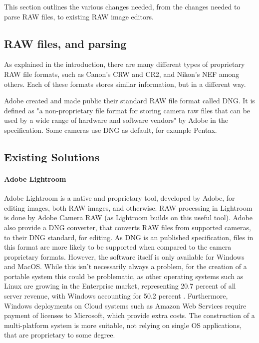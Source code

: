 \documentclass[10pt,a4paper]{article}
\begin{document}
This section outlines the various changes needed, from the changes needed to parse RAW files, to existing RAW image editors.

\subsection{RAW files, and parsing}
% 


As explained in the introduction, there are many different types of proprietary RAW file formats, such as Canon's CRW and CR2, and Nikon's NEF among others.
Each of these formats stores similar information, but in a different way.

Adobe created and made public their standard RAW file format called DNG. It is defined as "a non-proprietary file format for storing camera raw files that
can be used by a wide range of hardware and software vendors" by Adobe in the specification. \cite{DNGSpec} Some cameras use DNG as default, for example
Pentax.


\subsection{Existing Solutions}

    \paragraph{Adobe Lightroom}
    Adobe Lightroom is a native and proprietary tool, developed by Adobe, for editing images, both RAW images, and otherwise.
    RAW processing in Lightroom is done by Adobe Camera RAW (as Lightroom builds on this useful tool). \cite{AdobeCameraRAW}
    Adobe also provide a DNG converter, that converts RAW files from supported cameras, to their DNG standard,
    for editing. As DNG is an published specification, files in this format are more likely to be supported
    when compared to the camera proprietary formats. However, the software itself is only available for Windows
    and MacOS.\cite{AdobeDNGConverter} While this isn't necessarily always a problem, for the creation of a portable system this could be problematic,
    as other operating systems such as Linux are growing in the Enterprise market, representing 20.7 percent of all server revenue, with Windows
    accounting for 50.2 percent \cite{LinuxServerGrowth}. Furthermore, Windows deployments on Cloud systems such as Amazon Web Services require
    payment of licenses to Microsoft, which provide extra costs. The construction of a multi-platform system is more suitable, not relying on
    single OS applications, that are proprietary to some degree.
\end{document}

